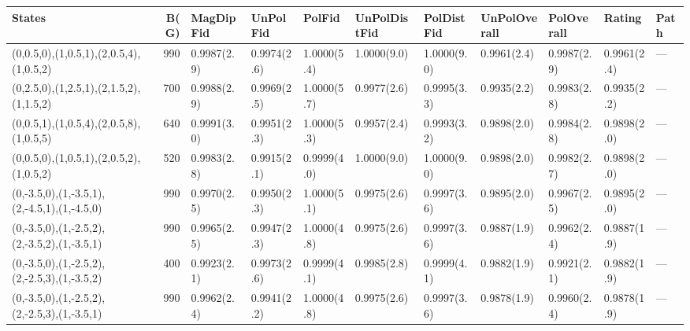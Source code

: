 \begin{tabular}{lrlllllllll}
\hline
 States                                      &   B(G) & MagDipFid   & UnPolFid    & PolFid      & UnPolDistFid   & PolDistFid   & UnPolOverall   & PolOverall   & Rating      & Path   \\
\hline
 (0,0.5,0),(1,0.5,1),(2,0.5,4),(1,0.5,2)     &    990 & 0.9987(2.9) & 0.9974(2.6) & 1.0000(5.4) & 1.0000(9.0)    & 1.0000(9.0)  & 0.9961(2.4)    & 0.9987(2.9)  & 0.9961(2.4) & ---    \\
 (0,2.5,0),(1,2.5,1),(2,1.5,2),(1,1.5,2)     &    700 & 0.9988(2.9) & 0.9969(2.5) & 1.0000(5.7) & 0.9977(2.6)    & 0.9995(3.3)  & 0.9935(2.2)    & 0.9983(2.8)  & 0.9935(2.2) & ---    \\
 (0,0.5,1),(1,0.5,4),(2,0.5,8),(1,0.5,5)     &    640 & 0.9991(3.0) & 0.9951(2.3) & 1.0000(5.3) & 0.9957(2.4)    & 0.9993(3.2)  & 0.9898(2.0)    & 0.9984(2.8)  & 0.9898(2.0) & ---    \\
 (0,0.5,0),(1,0.5,1),(2,0.5,2),(1,0.5,2)     &    520 & 0.9983(2.8) & 0.9915(2.1) & 0.9999(4.0) & 1.0000(9.0)    & 1.0000(9.0)  & 0.9898(2.0)    & 0.9982(2.7)  & 0.9898(2.0) & ---    \\
 (0,-3.5,0),(1,-3.5,1),(2,-4.5,1),(1,-4.5,0) &    990 & 0.9970(2.5) & 0.9950(2.3) & 1.0000(5.1) & 0.9975(2.6)    & 0.9997(3.6)  & 0.9895(2.0)    & 0.9967(2.5)  & 0.9895(2.0) & ---    \\
 (0,-3.5,0),(1,-2.5,2),(2,-3.5,2),(1,-3.5,1) &    990 & 0.9965(2.5) & 0.9947(2.3) & 1.0000(4.8) & 0.9975(2.6)    & 0.9997(3.6)  & 0.9887(1.9)    & 0.9962(2.4)  & 0.9887(1.9) & ---    \\
 (0,-3.5,0),(1,-2.5,2),(2,-2.5,3),(1,-3.5,2) &    400 & 0.9923(2.1) & 0.9973(2.6) & 0.9999(4.1) & 0.9985(2.8)    & 0.9999(4.1)  & 0.9882(1.9)    & 0.9921(2.1)  & 0.9882(1.9) & ---    \\
 (0,-3.5,0),(1,-2.5,2),(2,-2.5,3),(1,-3.5,1) &    990 & 0.9962(2.4) & 0.9941(2.2) & 1.0000(4.8) & 0.9975(2.6)    & 0.9997(3.6)  & 0.9878(1.9)    & 0.9960(2.4)  & 0.9878(1.9) & ---    \\
\hline
\end{tabular}